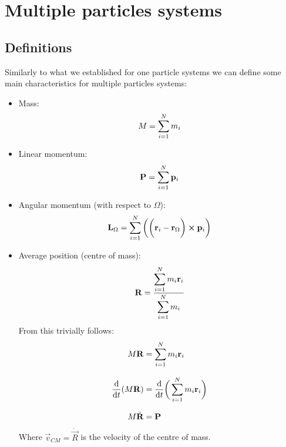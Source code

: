\section{Multiple particles systems}
\subsection{Definitions}
Similarly to what we established for one particle systems we can define some main characteristics for multiple particles systems:
\begin{itemize}
    \item Mass:\begin{equation}
        M = \displaystyle\sum_{i=1}^{N} m_i
    \end{equation}
    \item Linear momentum:\begin{equation}
        \vb{P} = \displaystyle\sum_{i=1}^{N} \vb{p}_i
    \end{equation}
    \item Angular momentum (with respect to $\Omega$):\begin{equation}
        \vb{L}_{\Omega} = \displaystyle\sum_{i=1}^{N} \bigg(\bigg(\vb{r}_i-\vb{r}_{\Omega}\bigg) \cross \vb{p}_i\bigg)
    \end{equation}
    \item Average position (centre of mass): \begin{equation} \label{e:centre_of_mass}
        \vb{R} = \dfrac{\displaystyle\sum_{i=1}^{N}m_i\vb{r}_i}{\displaystyle\sum_{i=1}^{N}m_i}
    \end{equation}
    From this trivially follows:
    \begin{equation}
        \begin{split}
          M \vb{R} &= \displaystyle\sum_{i=1}^{N}m_i\vb{r}_i \\[8pt]
          \dfrac{\mathrm{d}}{\mathrm{d}t}(M \vb{R}) &= \dfrac{\mathrm{d}}{\mathrm{d}t}\bigg(\displaystyle\sum_{i=1}^{N}m_i\vb{r}_i\bigg) \\[8pt]
          M \dot{\vb{R}} &= \vb{P}
        \end{split}
    \end{equation}
    Where $\vec{v}_{CM} = \dot{\vec{R}}$ is the velocity of the centre of mass.
\end{itemize}
